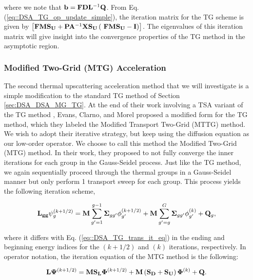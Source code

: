 \noindent where we note that ${\bf b}={\bf F} {\bf D}{\bf L}^{-1}  {\bf Q}$. From Eq. (\ref{eq::DSA_TG_op_update_simple}), the iteration matrix for the TG scheme is given by $\left[ {\bf F}  {\bf M} {\bf S_U} +  {\bf P} {\bf A}^{-1}  {\bf X} {\bf S_{U}} \left(  \ {\bf F}  {\bf M} {\bf S_U}  -  {\bf I} \right) \right]$. The eigenvalues of this iteration matrix will give insight into the convergence properties of the TG method in the asymptotic region.


\subsubsection{Modified Two-Grid (MTG) Acceleration}
\label{sec:DSA_DSA_MG_MTG}

The second thermal upscattering acceleration method that we will investigate is a simple modification to the standard TG method of Section \ref{sec:DSA_DSA_MG_TG}. At the end of their work involving a TSA variant of the TG method \cite{evans2010transport}, Evans, Clarno, and Morel proposed a modified form for the TG method, which they labeled the Modified Transport Two-Grid (MTTG) method. We wish to adopt their iterative strategy, but keep using the diffusion equation as our low-order operator. We choose to call this method the Modified Two-Grid (MTG) method. In their work, they proposed to not fully converge the inner iterations for each group in the Gauss-Seidel process. Just like the TG method, we again sequentially proceed through the thermal groups in a Gauss-Seidel manner but only perform 1 transport sweep for each group. This process yields the following iteration scheme,

\begin{equation}
\label{eq::DSA_MTG_trans_it_eq}
{\bf L_{gg}} \psi_g^{(k+1/2)} = {\bf M} \sum_{g'=1}^{g-1} {\bf \Sigma}_{g g'} \phi_{g'}^{(k+1/2)} + {\bf M} \sum_{g'=g}^G {\bf \Sigma}_{g g'} \phi_{g'}^{(k)} + {\bf Q}_g, 
\end{equation}

\noindent where it differs with Eq. (\ref{eq::DSA_TG_trans_it_eq}) in the ending and beginning energy indices for the $(k+1/2)$ and $(k)$ iterations, respectively. In operator notation, the iteration equation of the MTG method is the following:

\begin{equation}
\label{eq::DSA_MTG_trans_it_eq_ops}
{\bf L} {\bf \Psi}^{(k+1/2)} = {\bf M} {\bf S_L} {\bf \Phi}^{(k+1/2)} + {\bf M}\left(  {\bf S_D} + {\bf S_U} \right)  {\bf \Phi}^{(k)} + {\bf Q} .
\end{equation}

